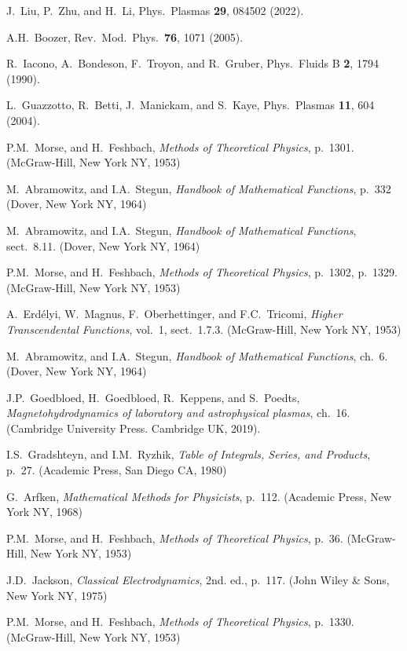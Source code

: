 \documentclass[12pt,prb,aps]{revtex4-1}
\begin{document}
\begin{thebibliography}{99}
 J.~Liu, P.~Zhu, and H.~Li, Phys.\ Plasmas  {\bf 29}, 084502 (2022).  

  A.H.~Boozer, Rev.\ Mod.\ Phys.\ {\bf 76}, 1071 (2005).

 R.~Iacono, A.~Bondeson, F.~Troyon, and R.~Gruber, Phys.\ Fluids B {\bf 2}, 1794 (1990).

 L.~Guazzotto,  R.~Betti, J.~Manickam, and  S.~Kaye, Phys.\ Plasmas {\bf 11}, 604 (2004).

 P.M.~Morse, and H.~Feshbach, {\em Methods of Theoretical Physics}, p.~1301. (McGraw-Hill, New York NY, 1953)

 M.~Abramowitz, and I.A.~Stegun, {\em Handbook of Mathematical Functions}, p.~332 (Dover, New York NY, 1964)

 M.~Abramowitz, and I.A.~Stegun, {\em Handbook of Mathematical Functions}, sect.~8.11. (Dover, New York NY, 1964)

 P.M.~Morse, and H.~Feshbach, {\em Methods of Theoretical Physics}, p.~1302, p.~1329. (McGraw-Hill, New York NY, 1953)

 A.~Erd\'{e}lyi, W.~Magnus, F.~Oberhettinger, and F.C.~Tricomi, {\em Higher Transcendental Functions}, vol.~1, sect.~1.7.3. 
(McGraw-Hill, New York NY, 1953)

 M.~Abramowitz, and I.A.~Stegun, {\em Handbook of Mathematical Functions}, ch.~6. (Dover, New York NY, 1964)

 J.P.~Goedbloed, H.~Goedbloed, R.~Keppens, and S.~Poedts, {\em Magnetohydrodynamics of laboratory and astrophysical plasmas}, ch.~16. (Cambridge University Press. Cambridge UK, 2019). 

 I.S.~Gradshteyn,  and I.M.~Ryzhik, {\em Table of Integrals, Series, and Products}, p.~27. (Academic Press, San Diego CA, 1980)

 G.~Arfken, {\em Mathematical Methods for Physicists}, p.~112. (Academic Press, New York NY, 1968) 

 P.M.~Morse, and H.~Feshbach, {\em Methods of Theoretical Physics}, p.~36. (McGraw-Hill, New York NY, 1953)

 J.D.~Jackson, {\em Classical Electrodynamics}, 2nd. ed., p.~117. (John Wiley \& Sons, New York NY, 1975)

 P.M.~Morse, and H.~Feshbach, {\em Methods of Theoretical Physics}, p.~1330. (McGraw-Hill, New York NY, 1953)


\end{thebibliography}
\end{document}
